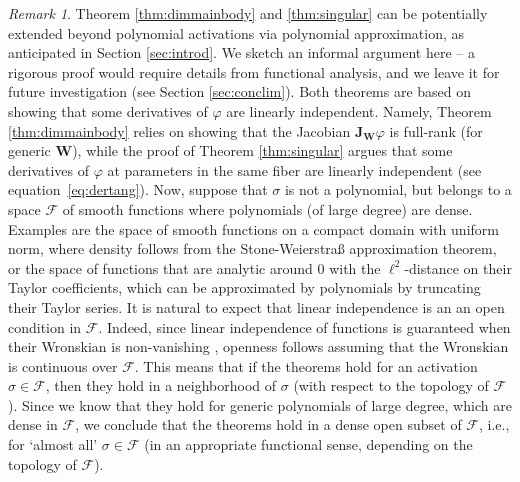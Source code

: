 \documentclass{article} %
\def\eqref#1{equation~\ref{#1}}
\theoremstyle{plain}%
\theoremstyle{definition}
\theoremstyle{remark}
\newtheorem{rmk}{Remark}[section]
\newcommand{\jacc}{\textbf{J}}
\begin{document}
\begin{rmk}\label{rem:newapprox}
Theorem \ref{thm:dimmainbody} and \ref{thm:singular} can be potentially extended beyond polynomial activations via polynomial approximation, as anticipated in Section \ref{sec:introd}. We sketch an informal argument here -- a rigorous proof would require details from functional analysis, and we leave it for future investigation (see Section \ref{sec:conclim}). Both  theorems are based on showing that some derivatives of $\varphi$ are linearly independent. Namely, Theorem \ref{thm:dimmainbody} relies on showing that the Jacobian $\jacc_{\mathbf{W}} \varphi $ is full-rank (for generic $\mathbf{W}$), while the proof of Theorem \ref{thm:singular} argues that some derivatives of $\varphi$ at parameters in the same fiber are linearly independent (see \eqref{eq:dertang}). Now, suppose that $\sigma$ is not a polynomial, but belongs to a space $\mathcal{F}$ of smooth functions where polynomials (of large degree) are dense. Examples are the space of smooth functions on a compact domain with uniform norm, where density follows from the Stone-Weierstra\ss{} approximation theorem, or the space of functions that are analytic around $0$ with the $\ell^2$-distance on their Taylor coefficients, which can be approximated by polynomials by truncating their Taylor series. It is natural to expect that linear independence is an an open condition in $\mathcal{F}$. Indeed, since linear independence of functions is guaranteed when their Wronskian is non-vanishing \citep{bender2013advanced}, openness follows assuming that the Wronskian is continuous over $\mathcal{F}$. This means that if the theorems hold for an activation $\sigma \in \mathcal{F}$, then they hold in a neighborhood of $\sigma$ (with respect to the topology of $\mathcal{F}$). Since we know that they hold for generic polynomials of large degree, which are dense in $\mathcal{F}$, we conclude that the theorems hold in a dense open subset of $\mathcal{F}$, i.e., for `almost all' $\sigma \in \mathcal{F}$ (in an appropriate functional sense, depending on the topology of $\mathcal{F}$).   
\end{rmk}
\end{document}
